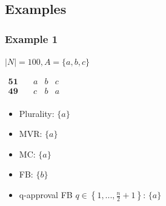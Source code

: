 \documentclass{beamer}
\begin{document}
\subsection{Examples}
\begin{frame}
	\frametitle{Example 1}
	$|N|=100, A=\{a,b,c\}$
	\begin{center}
		$
		\begin{array}{cccc}
		\mathbf{51} \quad &a&b&c\\
		\mathbf{49} \quad &c&b&a\\
		\end{array}
		$
	\end{center}
	\begin{itemize}
		\item<1-> Plurality: $\{a\}$
		\item<2-> MVR: $\{a\}$
		\item<3-> MC: $\{a\}$
		\item<4-> FB: $\{b\}$
		\item<5-> q-approval FB 	$q\in \left\{ 1,..., \frac{n}{2} +1\right\} $: $\{a\}$
	\end{itemize}
\end{frame}
\end{document}
